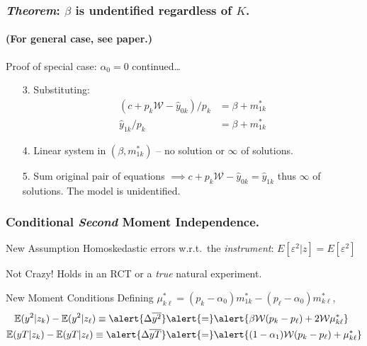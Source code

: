 \documentclass{beamer}
\begin{document}
\begin{frame}
  \frametitle{\emph{Theorem}: $\beta$ is undentified regardless of $K$.}
  \framesubtitle{(For general case, see paper.)}
  \begin{block}{Proof of special case: $\alpha_0 = 0$ continued\dots }
    \begin{enumerate}
      \item[3.] Substituting: 
    \vspace{0.5em}
\begin{align*}
  (c + p_k \mathcal{W} - \hat{y}_{0k})/p_k &=\beta + m_{1k}^* \\
  \hat{y}_{1k}/p_k &= \beta + m_{1k}^*
\end{align*}
\item[4.] Linear system in $(\beta, m_{1k}^*)$ -- no solution or $\infty$ of solutions.
\item[5.] Sum original pair of equations $\implies c + p_k \mathcal{W} - \hat{y}_{0k} = \hat{y}_{1k}$ thus $\infty$ of solutions.
  The model is unidentified.
    \end{enumerate}
  \end{block} 
    
\end{frame}
\begin{frame}
  \frametitle{Conditional \emph{Second} Moment Independence.} 
  \begin{block}{New Assumption}
    Homoskedastic errors w.r.t.\ the \emph{instrument}: $E[\varepsilon^2|z]=E[\varepsilon^2]$
  \end{block}
  \begin{block}{Not Crazy!}
    Holds in an RCT or a \emph{true} natural experiment.
  \end{block}
  \begin{alertblock}{New Moment Conditions}
  Defining
    $\mu_{k\ell}^* =  (p_k - \alpha_0) m_{1k}^* - (p_{\ell}-\alpha_0)m_{k\ell}^*$, 
  \begin{align*}
    \mathbb{E}(y^2|z_k) - \mathbb{E}(y^2|z_\ell) \equiv \alert{\Delta\overline{y^2}} &\alert{=}  \alert{\beta \mathcal{W} (p_k - p_\ell)  + 2 \mathcal{W} \mu_{k\ell}^*}\\
    \mathbb{E}(yT|z_k) - \mathbb{E}(yT|z_\ell) \equiv \alert{ \Delta\overline{yT}} &\alert{=} \alert{(1-\alpha_1)\mathcal{W}(p_k - p_\ell) + \mu_{k\ell}^*}
  \end{align*}
  \end{alertblock}
\end{frame}
\end{document}
